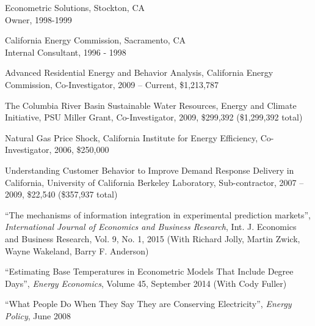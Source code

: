 \documentclass[Computer Science]{vita}
\begin{document}
\begin{vita}
\begin{Experience}
  \item Econometric Solutions, Stockton, CA\\
    Owner, 1998-1999
		
  \item California Energy Commission, Sacramento, CA\\
    Internal Consultant, 1996 - 1998
	  \end{Experience}

 \begin{Selected Grants and Sponsored Research}

\item Advanced Residential Energy and Behavior Analysis, California Energy Commission, Co-Investigator, 2009 -- Current, \$1,213,787

\item The Columbia River Basin Sustainable Water Resources, Energy and Climate Initiative,  PSU Miller Grant, Co-Investigator, 2009, \$299,392 (\$1,299,392 total)

  \item Natural Gas Price Shock, California Institute for Energy
    Efficiency, Co-Investigator, 2006, \$250,000


  \item Understanding Customer Behavior to Improve Demand Response Delivery in California, University of California Berkeley Laboratory, Sub-contractor, 2007 -- 2009, \$22,540 (\$357,937 total)


  \end{Selected Grants and Sponsored Research}

  \begin{Selected Publications}


    \begin{Papers in Refereed Journals}
    
 \item ``The mechanisms of information integration in experimental prediction markets'',  \emph{International Journal of Economics and Business Research}, Int. J. Economics and Business Research, Vol. 9, No. 1, 2015 (With Richard Jolly, Martin Zwick, Wayne Wakeland, Barry F. Anderson)
      
    \item ``Estimating Base Temperatures in Econometric Models That Include Degree Days'',  \emph{Energy Economics}, Volume 45, September 2014 (With Cody Fuller)
    
   
    \item ``What People Do When They Say They are Conserving
      Electricity'', \emph{Energy Policy}, June 2008



\end{Papers in Refereed Journals}
\end{Selected Publications}
\end{vita}
\end{document}
